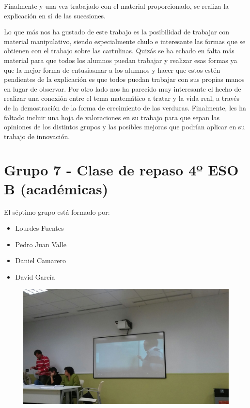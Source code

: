 Finalmente y una vez trabajado con el material proporcionado, se realiza la explicación en sí de las sucesiones.

Lo que más nos ha gustado de este trabajo es la posibilidad de trabajar con material manipulativo, siendo especialmente chulo e interesante las formas que se obtienen con el trabajo sobre las cartulinas. Quizás se ha echado en falta más material para que todos los alumnos puedan trabajar y realizar esas formas ya que la mejor forma de entusiasmar a los alumnos y hacer que estos estén pendientes de la explicación es que todos puedan trabajar con sus propias manos en lugar de observar. Por otro lado nos ha parecido muy interesante el hecho de realizar una conexión entre el tema matemático a tratar y la vida real, a través de la demostración de la forma de crecimiento de las verduras. Finalmente, les ha faltado incluir una hoja de valoraciones en su trabajo para que sepan las opiniones de los distintos grupos y las posibles mejoras que podrían aplicar en su trabajo de innovación.


\newpage
\section*{Grupo 7 - Clase de repaso 4º ESO B (académicas)}

El séptimo grupo está formado por:

\begin{itemize}
\item Lourdes Fuentes
\item Pedro Juan Valle
\item Daniel Camarero
\item David García
\end{itemize}


\begin{figure}[h]
\centering
\includegraphics[scale=0.20]{img/grupo7_1.jpg}
\end{figure}

